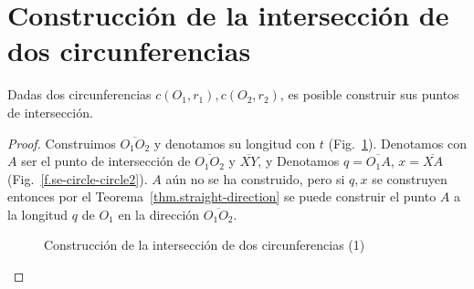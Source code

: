 \section{Construcción de la intersección de dos circunferencias}\label{s.two-circles}

\begin{theorem}
Dadas dos circunferencias $c(O_1,r_1), c(O_2,r_2)$, es posible construir sus puntos de intersección.
\end{theorem}

\begin{proof}
Construimos $\overline{O_1O_2}$ y denotamos su longitud con $t$ (Fig.~\ref{f.se-circle-circle1}).
Denotamos con $A$ ser el punto de intersección de $\overline{O_1O_2}$ y $\overline{XY}$, y Denotamos $q=\overline{O_1A}$, $x=\overline{XA}$ (Fig.~\ref{f.se-circle-circle2}). $A$ aún no se ha construido, pero si $q,x$ se construyen entonces por el Teorema~\ref{thm.straight-direction} se puede construir el punto $A$ a la longitud $q$ de $O_1$ en la dirección $\overline{O_1O_2}$.

\begin{figure}%
\begin{center}
\end{center}
\caption{Construcción de la intersección de dos circunferencias (1)}\label{f.se-circle-circle1}
\end{figure}


\end{proof}
